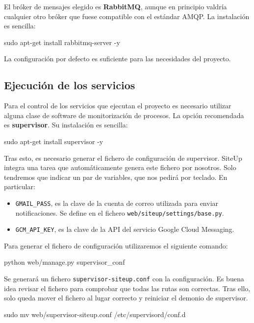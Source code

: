 El bróker de mensajes elegido es \textbf{RabbitMQ}, aunque en principio valdría
cualquier otro bróker que fuese compatible con el estándar \ac{AMQP}. La
instalación es sencilla:

\begin{bashcode}
sudo apt-get install rabbitmq-server -y
\end{bashcode}

La configuración por defecto es suficiente para las necesidades del proyecto.

\subsection{Ejecución de los servicios}

Para el control de los servicios que ejecutan el proyecto es necesario utilizar
alguna clase de software de monitorización de procesos. La opción recomendada es
\textbf{supervisor}. Su instalación es sencilla:

\begin{bashcode}
sudo apt-get install supervisor -y
\end{bashcode}

Tras esto, es necesario generar el fichero de configuración de
supervisor. SiteUp integra una tarea que automáticamente genera este fichero por
nosotros. Solo tendremos que indicar un par de variables, que nos pedirá por
teclado. En particular:

\begin{itemize}
\item \texttt{GMAIL\_PASS}, es la clave de la cuenta de correo utilizada para
  enviar notificaciones. Se define en el fichero \texttt{web/siteup/settings/base.py}.
\item \texttt{GCM\_API\_KEY}, es la clave de la API del servicio Google Cloud Messaging.
\end{itemize}

Para generar el fichero de configuración utilizaremos el siguiente comando:

\begin{bashcode}
python web/manage.py supervisor_conf
\end{bashcode}

Se generará un fichero \texttt{supervisor-siteup.conf} con la configuración. Es
buena idea revisar el fichero para comprobar que todas las rutas son
correctas. Tras ello, solo queda mover el fichero al lugar correcto y reiniciar
el demonio de supervisor.

\begin{bashcode}
sudo mv web/supervisor-siteup.conf /etc/supervisord/conf.d  
\end{bashcode}

